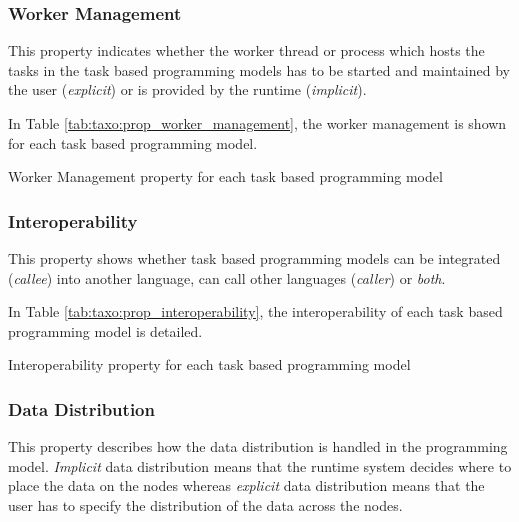 \subsubsection{Worker Management}
This property indicates whether the worker thread or process which hosts the tasks in the task based programming models has to be started and maintained by the user (\textit{explicit}) or is provided by the runtime (\textit{implicit}).

In Table \ref{tab:taxo:prop_worker_management}, the worker management is shown for each task based programming model.
\begin{table}[H]
	\caption{Worker Management property for each task based programming model \label{tab:taxo:prop_worker_management}}
	\centering
	\begin{multicols}{2}
		

		
	\end{multicols}
\end{table}

\subsubsection{Interoperability}
This property shows whether task based programming models can be integrated (\textit{callee}) into another language, can call other languages (\textit{caller}) or \textit{both}.

In Table \ref{tab:taxo:prop_interoperability}, the interoperability of each task based programming model is detailed.
\begin{table}[H]
	\caption{Interoperability property for each task based programming model \label{tab:taxo:prop_interoperability}}
	\centering
	\begin{multicols}{2}
		

		
	\end{multicols}
\end{table}

\subsubsection{Data Distribution}
This property describes how the data distribution is handled in the programming model.
\textit{Implicit} data distribution means that the runtime system decides where to place the data on the nodes whereas \textit{explicit} data distribution means that the user has to specify the distribution of the data across the nodes.

